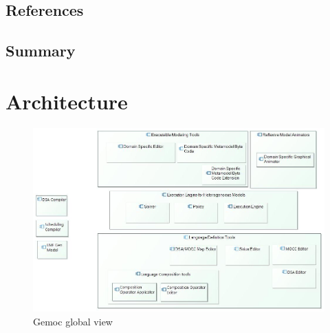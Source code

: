 \documentclass{gemoc} %
\begin{document}
\section{References}


\section{Summary}

 
\chapter{Architecture}
\begin{figure}[htp]
	\begin{center}
	\includegraphics*[trim=0.0cm 0.0cm 0cm 0.0cm, clip=true, width=1.0\linewidth]{../images/Global View.jpg}
	\caption{Gemoc global view}
	\label{fig:ComponentList}
	\end{center}
\end{figure}
\end{document}
